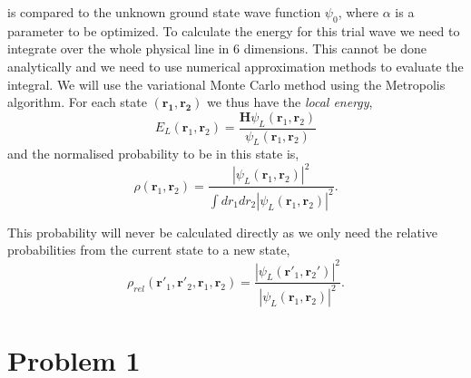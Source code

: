 is compared to the unknown ground state wave function $\psi_0$, where $\alpha$ is a parameter to be optimized. To calculate the energy for this trial wave we need to integrate over the whole physical line in 6 dimensions. This cannot be done analytically and we need to use numerical approximation methods to evaluate the integral. We will use the variational Monte Carlo method using the Metropolis algorithm. For each state $(\mathbf{r_1},\mathbf{r_2})$ we thus have the \textit{local energy},
\begin{equation}
E_{L}(\mathbf{r}_1,\mathbf{r}_2)= \frac{\mathbf{H}\psi_L(\mathbf{r}_1,\mathbf{r}_2)}{\psi_L(\mathbf{r}_1,\mathbf{r}_2)}
\end{equation}
and the normalised probability to be in this state is,
\begin{equation}
\rho(\mathbf{r}_1,\mathbf{r}_2)=\frac{|\psi_L(\mathbf{r}_1,\mathbf{r}_2)|^2}{\int dr_1dr_2|\psi_L(\mathbf{r}_1,\mathbf{r}_2)|^2}.
\end{equation}

This probability will never be calculated directly as we only need the relative probabilities from the current state to a new state,
\begin{equation}
\rho_{rel}(\mathbf{r'}_1,\mathbf{r'}_2,\mathbf{r}_1,\mathbf{r}_2)=\frac{|\psi_L(\mathbf{r'}_1,\mathbf{r}_2')|^2}{|\psi_L(\mathbf{r}_1,\mathbf{r}_2)|^2}.
\end{equation}


\section*{Problem 1}

